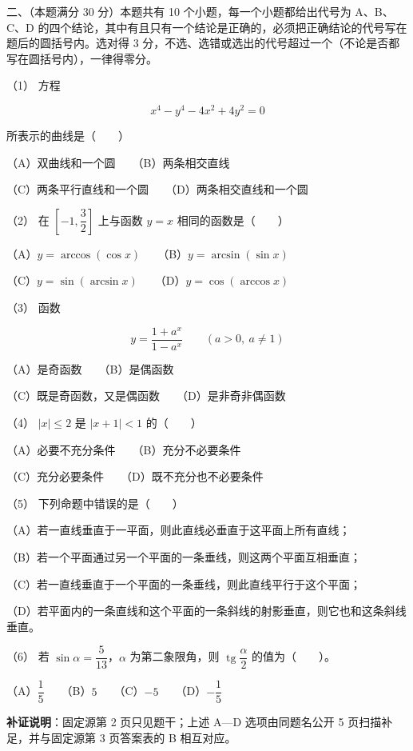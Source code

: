 \begin{question}

二、（本题满分 30 分）本题共有 10 个小题，每一个小题都给出代号为 A、B、C、D 的四个结论，其中有且只有一个结论是正确的，必须把正确结论的代号写在题后的圆括号内。选对得 3 分，不选、选错或选出的代号超过一个（不论是否都写在圆括号内），一律得零分。

（1） 方程

\nopagebreak[4]
\[
x^4-y^4-4x^2+4y^2=0
\]

所表示的曲线是\mbox{（　　）}

（A）双曲线和一个圆　　（B）两条相交直线

（C）两条平行直线和一个圆　　（D）两条相交直线和一个圆

（2） 在 $\left[-1,\dfrac32\right]$ 上与函数 $y=x$ 相同的函数是\mbox{（　　）}

（A）$y=\arccos(\cos x)$　　（B）$y=\arcsin(\sin x)$

（C）$y=\sin(\arcsin x)$　　（D）$y=\cos(\arccos x)$

（3） 函数

\nopagebreak[4]
\[
y=\frac{1+a^x}{1-a^x}\qquad(a>0,\ a\ne1)
\]

（A）是奇函数　　（B）是偶函数

（C）既是奇函数，又是偶函数　　（D）是非奇非偶函数

（4） $|x|\le2$ 是 $|x+1|<1$ 的\mbox{（　　）}

（A）必要不充分条件　　（B）充分不必要条件

（C）充分必要条件　　（D）既不充分也不必要条件

（5） 下列命题中错误的是\mbox{（　　）}

（A）若一直线垂直于一平面，则此直线必垂直于这平面上所有直线；

（B）若一个平面通过另一个平面的一条垂线，则这两个平面互相垂直；

（C）若一直线垂直于一个平面的一条垂线，则此直线平行于这个平面；

（D）若平面内的一条直线和这个平面的一条斜线的射影垂直，则它也和这条斜线垂直。

（6） 若 $\sin\alpha=\dfrac5{13}$，$\alpha$ 为第二象限角，则 $\operatorname{tg}\dfrac\alpha2$ 的值为\mbox{（　　）}。

（A）$\dfrac15$　　（B）$5$　　（C）$-5$　　（D）$-\dfrac15$

\begin{gktip}
\textbf{补证说明}：固定源第 2 页只见题干；上述 A—D 选项由同题名公开 5 页扫描补足，并与固定源第 3 页答案表的 B 相互对应。
\end{gktip}


\end{question}
